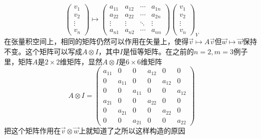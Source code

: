 \documentclass[a4paper,11pt]{article}
\begin{document}
    \begin{equation}
        \left(\begin{array}{c}
            v_{1} \\
            v_{2} \\
            \vdots \\
            v_{n}
            \end{array}\right) \longmapsto\left(\begin{array}{cccc}
            a_{11} & a_{12} & \cdots & a_{1 n} \\
            a_{22} & a_{22} & \cdots & a_{2 n} \\
            \vdots & \vdots & \ddots & \vdots \\
            a_{n 1} & a_{n 2} & \cdots & a_{n n}
            \end{array}\right)\left(\begin{array}{c}
            v_{1} \\
            v_{2} \\
            \vdots \\
            v_{n}
            \end{array}\right)_{V}
    \end{equation}
    在张量积空间上，相同的矩阵仍然可以作用在矢量上，使得$\vec{v} \mapsto A \vec{v}$但$\vec{w} \mapsto \vec{w}$保持不变。这个矩阵可以写成$A\otimes I$，其中$I$是恒等矩阵。在之前的$n=2,m=3$例子里，矩阵$A$是$2\times2$维矩阵，显然$A\otimes I$是$6\times6$维矩阵
    \begin{equation}
        A \otimes I=\left(\begin{array}{ccc|ccc}
            a_{11} & 0 & 0 & a_{12} & 0 & 0 \\
            0 & a_{11} & 0 & 0 & a_{12} & 0 \\
            0 & 0 & a_{11} & 0 & 0 & a_{12} \\
            \hline a_{21} & 0 & 0 & a_{22} & 0 & 0 \\
            0 & a_{21} & 0 & 0 & a_{22} & 0 \\
            0 & 0 & a_{21} & 0 & 0 & a_{22}
            \end{array}\right)
    \end{equation}
    把这个矩阵作用在$\vec{v}\otimes\vec{w}$上就知道了之所以这样构造的原因
\end{document}
